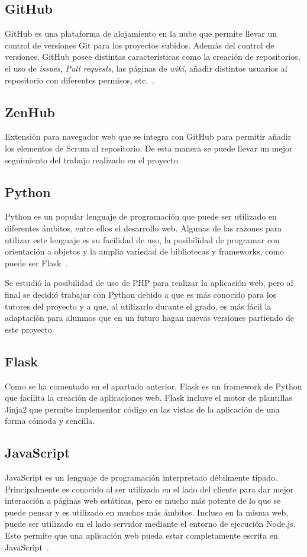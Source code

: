 \subsection{GitHub}
GitHub es una plataforma de alojamiento en la nube que permite llevar un control de versiones Git para los proyectos subidos. Además del control de versiones, GitHub posee distintas características como la creación de repositorios, el uso de \textit{issues}, \textit{Pull requests}, las páginas de \textit{wiki}, añadir distintos usuarios al repositorio con diferentes permisos, etc.~\cite{wiki:github}.

\subsection{ZenHub}
Extensión para navegador web que se integra con GitHub para permitir añadir los elementos de Scrum al repositorio. De esta manera se puede llevar un mejor seguimiento del trabajo realizado en el proyecto.

\subsection{Python}
Python es un popular lenguaje de programación que puede ser utilizado en diferentes ámbitos, entre ellos el desarrollo web. Algunas de las razones para utilizar este lenguaje es su facilidad de uso, la posibilidad de programar con orientación a objetos y la amplia variedad de bibliotecas y frameworks, como puede ser Flask~\cite{python}.

Se estudió la posibilidad de uso de PHP para realizar la aplicación web, pero al final se decidió trabajar con Python debido a que es más conocido para los tutores del proyecto y a que, al utilizarlo durante el grado, es más fácil la adaptación para alumnos que en un futuro hagan nuevas versiones partiendo de este proyecto.

\subsection{Flask}
Como se ha comentado en el apartado anterior, Flask es un framework de Python que facilita la creación de aplicaciones web. Flask incluye el motor de plantillas Jinja2 que permite implementar código en las vistas de la aplicación de una forma cómoda y sencilla.

\subsection{JavaScript}
JavaScript es un lenguaje de programación interpretado débilmente tipado. Principalmente es conocido al ser utilizado en el lado del cliente para dar mejor interacción a páginas web estáticas, pero es mucho más potente de lo que se puede pensar y es utilizado en muchos más ámbitos. Incluso en la misma web, puede ser utilizado en el lado servidor mediante el entorno de ejecución Node.js. Esto permite que una aplicación web pueda estar completamente escrita en JavaScript~\cite{javascript}.

